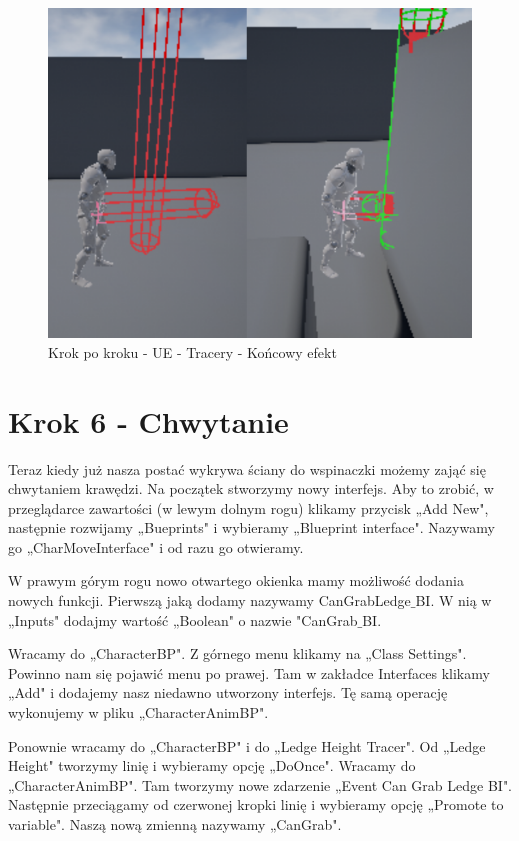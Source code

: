 \documentclass[12pt]{xmgr}
\begin{document}
\begin{figure}[!htb]
    \begin{center}
    \includegraphics[scale=0.35]{Screeny/UeKrokPoKroku/spherecollision}
    \end{center}
    \caption{Krok po kroku - UE - Tracery - Końcowy efekt}
\end{figure}

\section{Krok 6 - Chwytanie}

Teraz kiedy już nasza postać wykrywa ściany do wspinaczki możemy zająć się chwytaniem krawędzi. Na początek stworzymy nowy interfejs. Aby to zrobić, w przeglądarce zawartości (w lewym dolnym rogu) klikamy przycisk „Add New", następnie rozwijamy „Bueprints" i wybieramy „Blueprint interface". Nazywamy go „CharMoveInterface" i od razu go otwieramy.

W prawym górym rogu nowo otwartego okienka mamy możliwość dodania nowych funkcji. Pierwszą jaką dodamy nazywamy CanGrabLedge$\_$BI. W nią w „Inputs" dodajmy wartość „Boolean" o nazwie "CanGrab$\_$BI.

Wracamy do „CharacterBP". Z górnego menu klikamy na „Class Settings". Powinno nam się pojawić menu po prawej. Tam w zakładce Interfaces klikamy „Add" i dodajemy nasz niedawno utworzony interfejs. Tę samą operację wykonujemy w pliku „CharacterAnimBP".

Ponownie wracamy do „CharacterBP" i do „Ledge Height Tracer". Od „Ledge Height" tworzymy linię i wybieramy opcję „DoOnce". Wracamy do „CharacterAnimBP". Tam tworzymy nowe zdarzenie „Event Can Grab Ledge BI". Następnie przeciągamy od czerwonej kropki linię i wybieramy opcję „Promote to variable". Naszą nową zmienną nazywamy „CanGrab".
\end{document}
